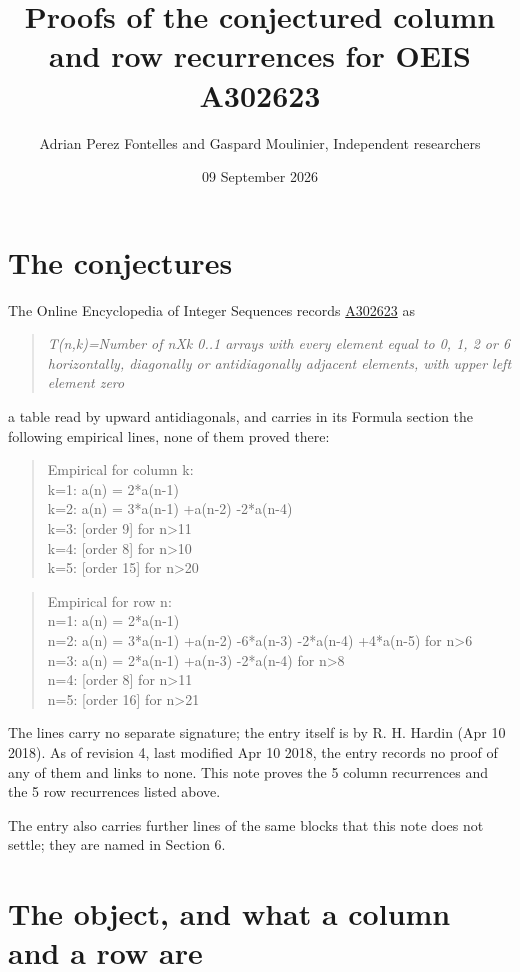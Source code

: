 \documentclass[11pt]{article}
\title{Proofs of the conjectured column and row recurrences for OEIS A302623}
\author{Adrian Perez Fontelles and Gaspard Moulinier, Independent researchers}
\date{09 September 2026}
\theoremstyle{definition}
\begin{document}
\maketitle
\section{The conjectures}

The Online Encyclopedia of Integer Sequences records \href{https://oeis.org/A302623}{A302623} as

\begin{quote}\itshape T(n,k)=Number of nXk 0..1 arrays with every element equal to 0, 1, 2 or 6 horizontally, diagonally or antidiagonally adjacent elements, with upper left element zero\end{quote}

a table read by upward antidiagonals, and carries in its Formula section the following empirical lines, none of them proved there:

\begin{quote}\ttfamily Empirical for column k:\\
k=1: a(n) = 2*a(n-1)\\k=2: a(n) = 3*a(n-1) +a(n-2) -2*a(n-4)\\k=3: [order 9] for n>11\\k=4: [order 8] for n>10\\k=5: [order 15] for n>20\end{quote}

\begin{quote}\ttfamily Empirical for row n:\\
n=1: a(n) = 2*a(n-1)\\n=2: a(n) = 3*a(n-1) +a(n-2) -6*a(n-3) -2*a(n-4) +4*a(n-5) for n>6\\n=3: a(n) = 2*a(n-1) +a(n-3) -2*a(n-4) for n>8\\n=4: [order 8] for n>11\\n=5: [order 16] for n>21\end{quote}

The lines carry no separate signature; the entry itself is by R. H. Hardin (Apr 10 2018). As of revision 4, last modified Apr 10 2018, the entry records no proof of any of them and links to none. This note proves the 5 column recurrences and the 5 row recurrences listed above.

The entry also carries further lines of the same blocks that this note does not settle; they are named in Section 6.

\section{The object, and what a column and a row are}
\end{document}
